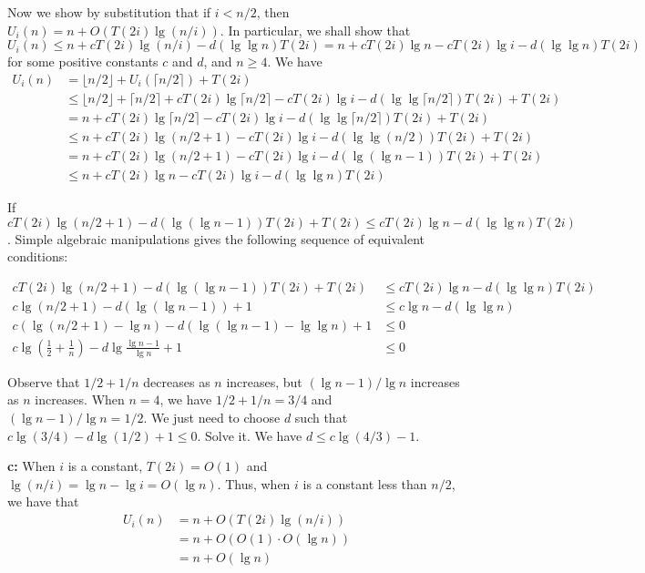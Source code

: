 \documentclass{book}
\begin{document}
\begin{CJK}{UTF8}{gkai}
Now we show by substitution that if $i < n/2$, then $U_i(n) = n + 
O(T(2i)\lg(n/i))$. In particular, we shall show that $U_i(n) \le n + 
cT(2i)\lg(n/i) - d(\lg\lg n)T(2i) = n + cT(2i)\lg n - cT(2i)\lg i - d(\lg\lg 
n)T(2i)$ for some positive constants $c$ and $d$, and $n\ge4$. We have
\begin{align*}
U_i(n) & = \lfloor n/2 \rfloor + U_i(\lceil n/2 \rceil) + T(2i) \\
& \le \lfloor n/2 \rfloor + \lceil n/2 \rceil + cT(2i)\lg\lceil n/2 \rceil - 
cT(2i)\lg i -d(\lg\lg\lceil n/2 \rceil)T(2i) + T(2i) \\
& = n + cT(2i)\lg\lceil n/2 \rceil -cT(2i)\lg i - d(\lg\lg\lceil n/2 
\rceil)T(2i) + T(2i) \\
& \le n + cT(2i)\lg(n/2+1) -cT(2i)\lg i - d(\lg\lg(n/2))T(2i) + T(2i) \\
& = n + cT(2i)\lg(n/2+1) - cT(2i)\lg i - d(\lg(\lg n - 1))T(2i) + T(2i) \\
& \le n + cT(2i)\lg n - cT(2i)\lg i - d(\lg\lg n)T(2i)
\end{align*}

If $cT(2i)\lg(n/2+1) -d(\lg(\lg n -1))T(2i) + T(2i) \le cT(2i)\lg n - d(\lg\lg 
n)T(2i)$. Simple algebraic manipulations gives the following sequence of 
equivalent conditions:

\begin{align*}
cT(2i)\lg(n/2+1) -d(\lg(\lg n -1))T(2i) + T(2i) & \le cT(2i)\lg n - d(\lg\lg 
n)T(2i) \\
c\lg(n/2+1) - d(\lg(\lg n - 1)) + 1 & \le c\lg n - d(\lg\lg n) \\
c(\lg(n/2+1)-\lg n) - d(\lg(\lg n -1) - \lg\lg n) + 1 & \le 0 \\
c\lg(\frac{1}{2}+\frac{1}{n}) - d\lg\frac{\lg n -1}{\lg n} + 1 & \le 0
\end{align*}

Observe that $1/2+1/n$ decreases as $n$ increases, but $(\lg n -1)/\lg n$ 
increases as $n$ increases. When $n = 4$, we have $1/2+1/n=3/4$ and $(\lg n - 
1)/\lg n = 1/2$. We just need to choose $d$ such that $c\lg(3/4) - d\lg(1/2) + 1 
  \le 0$. Solve it. We have $d \le c\lg(4/3) - 1$.

\textbf{c:} When $i$ is a constant, $T(2i) = O(1)$ and $\lg(n/i) = \lg n - \lg i 
= O(\lg n)$. Thus, when $i$ is a constant less than $n/2$, we have that
\begin{align*}
U_i(n) & = n + O(T(2i)\lg(n/i)) \\
& = n + O(O(1)\cdot O(\lg n)) \\
& = n + O(\lg n)
\end{align*}



\end{CJK}
\end{document}
